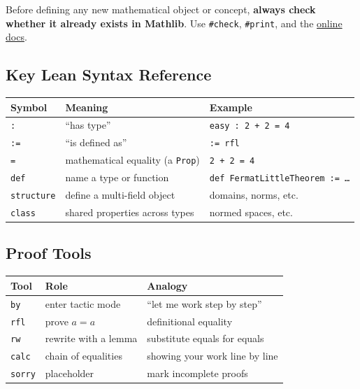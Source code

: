 ﻿\documentclass[12pt, a4paper]{article}
\renewcommand{\_}{\origunderscore\allowbreak}
\theoremstyle{definition}
\theoremstyle{plain}
\begin{document}
\begin{tcolorbox}[colback=mathgreen!6, colframe=mathgreen!50]
  Before defining any new mathematical object or concept,
  \textbf{always check whether it already exists in Mathlib}.
  Use \texttt{\#check}, \texttt{\#print}, and the
  \href{https://leanprover-community.github.io/mathlib4_docs/}{online docs}.
\end{tcolorbox}

\subsection{Key Lean Syntax Reference}

\begin{center}
\begin{tabular}{@{}lll@{}}
  \toprule
  \textbf{Symbol} & \textbf{Meaning} & \textbf{Example} \\
  \midrule
  \texttt{:}  & ``has type'' & \texttt{easy : 2 + 2 = 4} \\
  \texttt{:=} & ``is defined as'' & \texttt{:= rfl} \\
  \texttt{=}  & mathematical equality (a \texttt{Prop}) & \texttt{2 + 2 = 4} \\
  \texttt{def} & name a type or function & \texttt{def FermatLittleTheorem := \ldots} \\
  \texttt{structure} & define a multi-field object & domains, norms, etc. \\
  \texttt{class} & shared properties across types & normed spaces, etc. \\
  \bottomrule
\end{tabular}
\end{center}

\subsection{Proof Tools}

\begin{center}
\begin{tabular}{@{}lll@{}}
  \toprule
  \textbf{Tool} & \textbf{Role} & \textbf{Analogy} \\
  \midrule
  \texttt{by}   & enter tactic mode     & ``let me work step by step'' \\
  \texttt{rfl}  & prove $a = a$         & definitional equality \\
  \texttt{rw}   & rewrite with a lemma  & substitute equals for equals \\
  \texttt{calc} & chain of equalities   & showing your work line by line \\
  \texttt{sorry}& placeholder           & mark incomplete proofs \\
  \bottomrule
\end{tabular}
\end{center}
\end{document}
